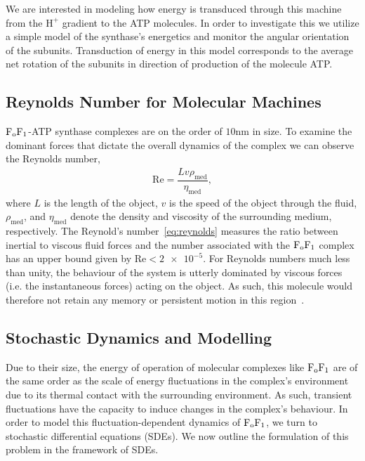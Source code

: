\documentclass[11pt]{article}
\newcommand{\fofI}{\mathrm{F}_{\rm o}\mathrm{F}_{1}}
\begin{document}
We are interested in modeling how energy is transduced through this machine from the $\mathrm{H}^{+}$ gradient to the ATP
molecules. In order to investigate this we utilize a simple model of the synthase's energetics and monitor 
the angular orientation of the subunits. Transduction of energy in this model corresponds to the average 
net rotation of the subunits in direction of production of the molecule ATP.  

\subsection{Reynolds Number for Molecular Machines}

$\fofI$-ATP synthase complexes are on the order of $10\si{\nano\meter}$ in size. To examine the dominant forces that dictate the 
overall dynamics of the complex we can observe the Reynolds number,
\begin{align}
    \mathrm{Re} = \dfrac{Lv\rho_{\mathrm{med}}}{\eta_{\mathrm{med}}},\label{eq:reynolds}
\end{align}
where $L$ is the length of the object, $v$ is the speed of the object through the fluid, $\rho_{\mathrm{med}}$, and $\eta_{\mathrm{med}}$ denote the density and viscosity of the surrounding medium, respectively. The Reynold's number~\eqref{eq:reynolds} measures the ratio between inertial to viscous fluid forces and the number associated with the $\fofI$ complex has an upper bound given by $\mathrm{Re} < \num{2e-5}$. For Reynolds numbers much less than unity, the behaviour of the system is utterly dominated by viscous forces (i.e. the instantaneous forces)  acting on the object.  As such, this molecule would therefore not retain any memory or persistent motion in this region~\cite{berg_rnd_walks}. 

\subsection{Stochastic Dynamics and Modelling}

Due to their size, the energy of operation of molecular complexes like $\fofI$ are of the same order as the scale of energy fluctuations in
the complex's environment due to its thermal contact with the surrounding environment. As such, transient fluctuations have the capacity
to induce changes in the complex's behaviour. In order to model this fluctuation-dependent dynamics of $\fofI$, we turn to stochastic differential equations (SDEs). We now outline the formulation of this problem in the framework of SDEs.
\end{document}
